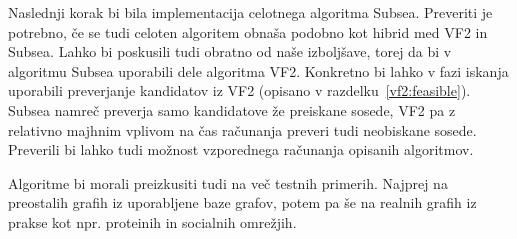\documentclass[a4paper, 12pt, ]{book}
\renewcommand{\baselinestretch}{1.3} %
\newcommand{\clearemptydoublepage}{\newpage{\pagestyle{empty}\cleardoublepage}}
\begin{document}
	Naslednji korak bi bila implementacija celotnega algoritma Subsea. Preveriti je potrebno, če se tudi celoten algoritem obnaša podobno kot hibrid med
	VF2 in Subsea. Lahko bi poskusili tudi obratno od naše izboljšave, torej da bi v algoritmu Subsea uporabili dele algoritma VF2. Konkretno bi lahko v
	fazi iskanja uporabili preverjanje kandidatov iz VF2 (opisano v razdelku~\ref{vf2:feasible}). Subsea namreč preverja samo kandidatove že preiskane
	sosede, VF2 pa z relativno majhnim vplivom na čas računanja preveri tudi neobiskane sosede. Preverili bi lahko tudi možnost vzporednega računanja
	opisanih algoritmov.

	Algoritme bi morali preizkusiti tudi na več testnih primerih. Najprej na preostalih grafih iz uporabljene baze grafov, potem pa še na realnih grafih iz
	prakse kot npr. proteinih in socialnih omrežjih.


	
\clearemptydoublepage
\renewcommand{\baselinestretch}{1.0} %
\appendix
\end{document}
